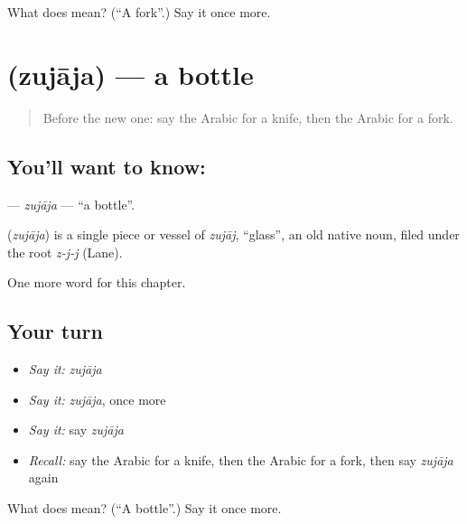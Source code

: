 \begin{tcolorbox}[breakable,colback=teal!4,colframe=teal!35!black,title={Before you move on}]
What does  mean? (\textquotedblleft{}A fork\textquotedblright{}.) Say it once more.
\end{tcolorbox}
\section[\texorpdfstring{\ar{زجاجة} (zujāja)}{زجاجة (zujāja)}]{ (zujāja) — a bottle}

\label{lesson:AR-C72-zujaja}



\begin{quote}
Before the new one: say the Arabic for a knife, then the Arabic for a fork.
\end{quote}

\subsection*{You'll want to know: }
\textbf{} — \emph{zujāja} — \textquotedblleft{}a bottle\textquotedblright{}.

\begin{cousinweb}
\textbf{} (\emph{zujāja}) is a single piece or vessel of \emph{zujāj}, \textquotedblleft{}glass\textquotedblright{}, an old native noun, filed under the root \emph{z-j-j} (Lane).
\end{cousinweb}

\begin{grammarlens}[title={What you've built}]
One more word for this chapter.
\end{grammarlens}

\subsection*{Your turn}
\begin{itemize}
\raggedright
  \item \emph{Say it:} \emph{zujāja}
  \item \emph{Say it:} \emph{zujāja}, once more
  \item \emph{Say it:} say \emph{zujāja}
  \item \emph{Recall:} say the Arabic for a knife, then the Arabic for a fork, then say \emph{zujāja} again
\end{itemize}

\begin{tcolorbox}[breakable,colback=teal!4,colframe=teal!35!black,title={Before you move on}]
What does  mean? (\textquotedblleft{}A bottle\textquotedblright{}.) Say it once more.
\end{tcolorbox}

